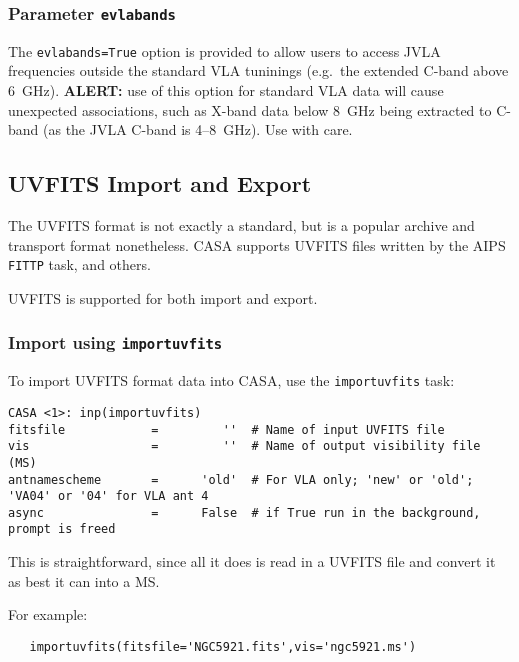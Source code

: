 \subsubsection{Parameter {\tt evlabands} }
\label{section:io.import.vla.evlabands}

The {\tt evlabands=True} option is provided to allow users to access
JVLA frequencies outside the standard VLA tuninings (e.g.\ the extended
C-band above 6~GHz).  {\bf ALERT:} use of this option for standard VLA
data will cause unexpected associations, such as X-band data below
8~GHz being extracted to C-band (as the JVLA C-band is 4--8~GHz).  Use
with care.

\subsection{UVFITS Import and Export}
\label{section:io.import.uvfits}

The UVFITS format is not exactly a standard, but is a popular
archive and transport format nonetheless.  CASA supports 
UVFITS files written by the AIPS {\tt FITTP} task, and others.

UVFITS is supported for both import and export.




\subsubsection{Import using {\tt importuvfits} }
\label{section:io.import.uvfits.import}

To import UVFITS format data into CASA, use the {\tt importuvfits} task: 
\small
\begin{verbatim}
CASA <1>: inp(importuvfits)
fitsfile            =         ''  # Name of input UVFITS file
vis                 =         ''  # Name of output visibility file (MS)
antnamescheme       =      'old'  # For VLA only; 'new' or 'old'; 'VA04' or '04' for VLA ant 4
async               =      False  # if True run in the background, prompt is freed
\end{verbatim}
\normalsize
This is straightforward, since all it does is read in a UVFITS file and
convert it as best it can into a MS.

For example:
\small
\begin{verbatim}
   importuvfits(fitsfile='NGC5921.fits',vis='ngc5921.ms')
\end{verbatim}
\normalsize

